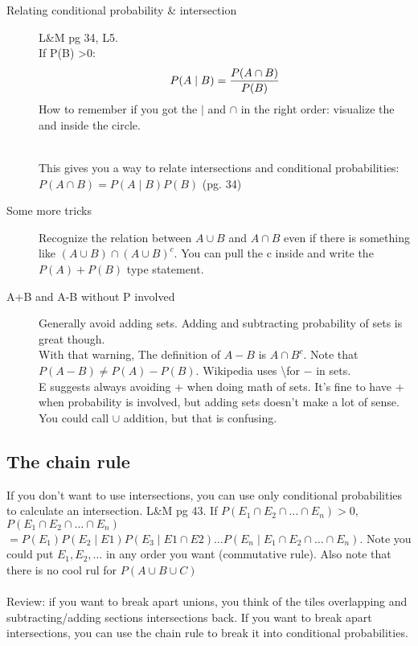 \begin{description}
\item[Relating conditional probability \& intersection]     L\&M pg 34, L5. \hfill \\
If P(B) \textgreater 0:
	\begin{align*}
		P(A \mid B) = \frac{ P(A \cap B) }{ P(B) }   \hfill \\
	\end{align*}
How to remember if you got the $\mid$ and $\cap$ in the right order: visualize the and inside the circle.

\hfill \\
This gives you a way to relate intersections and conditional probabilities:
$P(A \cap B) = P(A \mid B)P(B)$  (pg. 34)

\item[Some more tricks]
	Recognize the relation between $A \cup B$  and $A \cap B$ even if there is something like $(A \cup B) \cap (A \cup B)^c$.  You can pull the c inside and write the $P(A) + P(B)$ type statement.
	
\item[A+B and A-B without P involved]
Generally avoid adding sets.  Adding and subtracting probability of sets is great though. \hfill \\
With that warning, The definition of $A-B$ is $A \cap B^c$.  Note that $P(A-B) \neq P(A) - P(B)$.  Wikipedia uses \textbackslash  for $-$ in sets. \hfill \\ 
E suggests always avoiding + when doing math of sets.  It's fine to have + when probability is involved, but adding sets doesn't make a lot of sense.  You could call $\cup$ addition, but that is confusing.  
\end{description}

\subsection{The chain rule}
If you don't want to use intersections, you can use only conditional probabilities to calculate an intersection.  {\tiny L\&M pg 43.}
If $P(E_1 \cap E_2 \cap \dots \cap E_n) > 0$, \hfill \\
$P(E_1 \cap E_2 \cap \dots \cap E_n)$  \hfill \\ 
$= P(E_1)P(E_2 \mid E1)P(E_3 \mid E1 \cap E2) \dots P(E_n \mid E_1 \cap E_2 \cap \dots \cap E_n)$.
 Note you could put $E_1, E_2, \dots$ in any order you want (commutative rule).  Also note that there is no cool rul for $P(A \cup B \cup C)$ \hfill \\ 
 \hfill \\
Review: if you want to break apart unions, you think of the tiles overlapping and subtracting/adding sections intersections back.  If you want to break apart intersections, you can use the chain rule to break it into conditional probabilities.  
 \hfill \\
 
